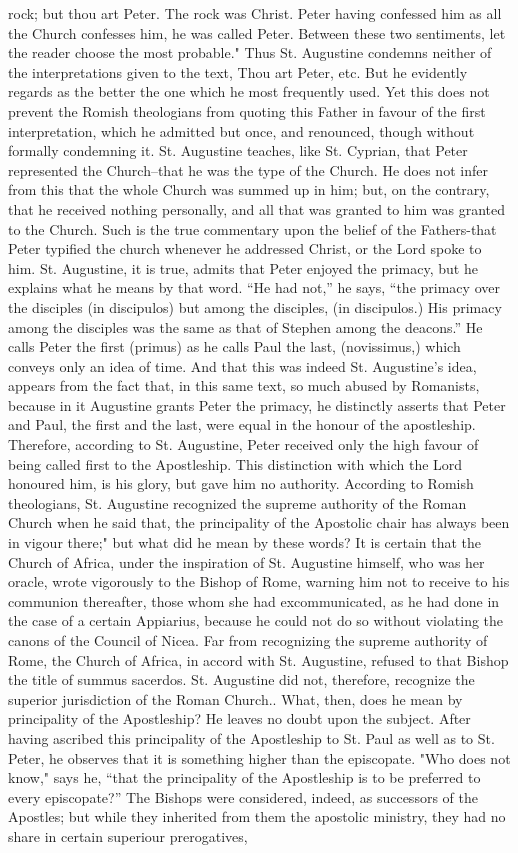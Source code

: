 rock; but thou art Peter. The rock was Christ. Peter having confessed him as all the Church confesses him, he was called Peter. Between these two sentiments, let the reader choose the most probable." Thus St. Augustine condemns neither of the interpretations given to the text, Thou art Peter, etc. But he evidently regards as the better the one which he most frequently used. Yet this does not prevent the Romish theologians from quoting this Father in favour of the first interpretation, which he admitted but once, and renounced, though without formally condemning it. St. Augustine teaches, like St. Cyprian, that Peter represented the Church--that he was the type of the Church. He does not infer from this that the whole Church was summed up in him; but, on the contrary, that he received nothing personally, and all that was granted to him was granted to the Church. Such is the true commentary upon the belief of the Fathers-that Peter typified the church whenever he addressed Christ, or the Lord spoke to him. St. Augustine, it is true, admits that Peter enjoyed the primacy, but he explains what he means by that word. “He had not,” he says, “the primacy over the disciples (in discipulos) but among the disciples, (in discipulos.) His primacy among the disciples was the same as that of Stephen among the deacons.” He calls Peter the first (primus) as he calls Paul the last, (novissimus,) which conveys only an idea of time. And that this was indeed St. Augustine’s idea, appears from the fact that, in this same text, so much abused by Romanists, because in it Augustine grants Peter the primacy, he distinctly asserts that Peter and Paul, the first and the last, were equal in the honour of the apostleship. Therefore, according to St. Augustine, Peter received only the high favour of being called first to the Apostleship. This distinction with which the Lord honoured him, is his glory, but gave him no authority. According to Romish theologians, St. Augustine recognized the supreme authority of the Roman Church when he said that, the principality of the Apostolic chair has always been in vigour there;" but what did he mean by these words? It is certain that the Church of Africa, under the inspiration of St. Augustine himself, who was her oracle, wrote vigorously to the Bishop of Rome, warning him not to receive to his communion thereafter, those whom she had excommunicated, as he had done in the case of a certain Appiarius, because he could not do so without violating the canons of the Council of Nicea. Far from recognizing the supreme authority of Rome, the Church of Africa, in accord with St. Augustine, refused to that Bishop the title of summus sacerdos. St. Augustine did not, therefore, recognize the superior jurisdiction of the Roman Church.. What, then, does he mean by principality of the Apostleship? He leaves no doubt upon the subject. After having ascribed this principality of the Apostleship to St. Paul as well as to St. Peter, he observes that it is something higher than the episcopate. "Who does not know," says he, “that the principality of the Apostleship is to be preferred to every episcopate?” The Bishops were considered, indeed, as successors of the Apostles; but while they inherited from them the apostolic ministry, they had no share in certain superiour prerogatives, 